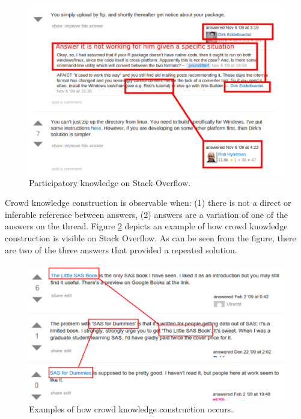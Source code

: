 \documentclass{sig-alternate-05-2015}
\begin{document}
	\begin{figure}[!htb]
		\centering
		\includegraphics[width=\columnwidth]{Figures/SO-PKimg5}
		\caption{Participatory knowledge on Stack Overflow.}
		\label{fig:SO-PK1}
	\end{figure}

	Crowd knowledge construction is observable when:
	(1) there is not a direct or inferable reference between answers, 
	(2) answers are a variation of one of the answers on the thread.
	Figure \ref{fig:CKC_MLSO} depicts an example of how crowd knowledge construction is visible on Stack Overflow.
	As can be seen from the figure, there are two of the three answers that provided a repeated solution.


	\begin{figure} [!htb]
		\centering
		\includegraphics[width=\columnwidth]{Figures/SO-CSimg2}
		\caption{Examples of how crowd knowledge construction occurs.}
		\label{fig:CKC_MLSO}
	\end{figure}
\end{document}
